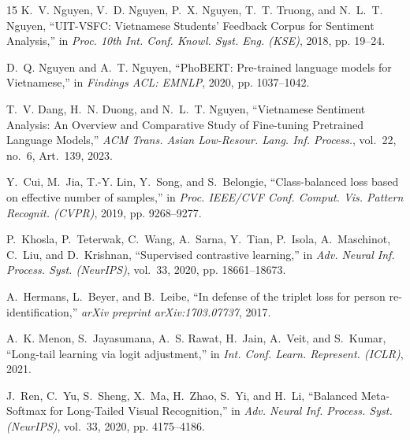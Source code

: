 \documentclass[10pt,journal,compsoc]{IEEEtran}
\begin{document}
\begin{thebibliography}{15}
K.~V. Nguyen, V.~D. Nguyen, P.~X. Nguyen, T.~T. Truong, and N.~L.~T. Nguyen, ``UIT-VSFC: Vietnamese Students' Feedback Corpus for Sentiment Analysis,'' in \emph{Proc. 10th Int. Conf. Knowl. Syst. Eng. (KSE)}, 2018, pp. 19--24.

D.~Q. Nguyen and A.~T. Nguyen, ``PhoBERT: Pre-trained language models for Vietnamese,'' in \emph{Findings ACL: EMNLP}, 2020, pp. 1037--1042.

T.~V. Dang, H.~N. Duong, and N.~L.~T. Nguyen, ``Vietnamese Sentiment Analysis: An Overview and Comparative Study of Fine-tuning Pretrained Language Models,'' \emph{ACM Trans. Asian Low-Resour. Lang. Inf. Process.}, vol.~22, no.~6, Art.~139, 2023.

Y.~Cui, M.~Jia, T.-Y. Lin, Y.~Song, and S.~Belongie, ``Class-balanced loss based on effective number of samples,'' in \emph{Proc. IEEE/CVF Conf. Comput. Vis. Pattern Recognit. (CVPR)}, 2019, pp. 9268--9277.

P.~Khosla, P.~Teterwak, C.~Wang, A.~Sarna, Y.~Tian, P.~Isola, A.~Maschinot, C.~Liu, and D.~Krishnan, ``Supervised contrastive learning,'' in \emph{Adv. Neural Inf. Process. Syst. (NeurIPS)}, vol.~33, 2020, pp. 18661--18673.

A.~Hermans, L.~Beyer, and B.~Leibe, ``In defense of the triplet loss for person re-identification,'' \emph{arXiv preprint arXiv:1703.07737}, 2017.

A.~K. Menon, S.~Jayasumana, A.~S. Rawat, H.~Jain, A.~Veit, and S.~Kumar, ``Long-tail learning via logit adjustment,'' in \emph{Int. Conf. Learn. Represent. (ICLR)}, 2021.

J.~Ren, C.~Yu, S.~Sheng, X.~Ma, H.~Zhao, S.~Yi, and H.~Li, ``Balanced Meta-Softmax for Long-Tailed Visual Recognition,'' in \emph{Adv. Neural Inf. Process. Syst. (NeurIPS)}, vol.~33, 2020, pp. 4175--4186.
\end{thebibliography}
\end{document}
